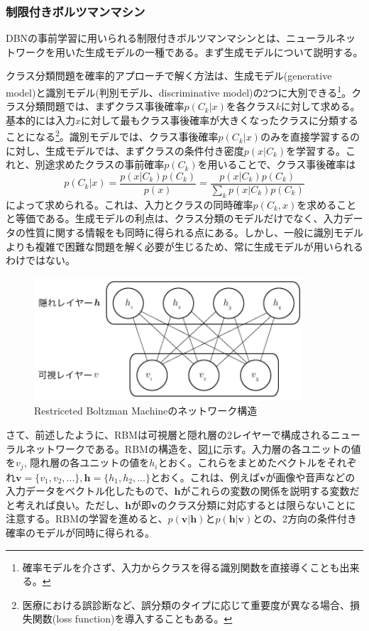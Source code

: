 \subsubsection{制限付きボルツマンマシン}
DBNの事前学習に用いられる制限付きボルツマンマシン\cite{smolensky1986information}とは、ニューラルネットワークを用いた生成モデルの一種である。まず生成モデルについて説明する。\par
クラス分類問題を確率的アプローチで解く方法は、生成モデル(generative model)と識別モデル(判別モデル、discriminative model)の2つに大別できる\cite{bishop2006pattern}\footnote{確率モデルを介さず、入力からクラスを得る識別関数を直接導くことも出来る。}。クラス分類問題では、まずクラス事後確率$p(C_k|x)$を各クラス$k$に対して求める。基本的には入力$x$に対して最もクラス事後確率が大きくなったクラスに分類することになる\footnote{医療における誤診断など、誤分類のタイプに応じて重要度が異なる場合、損失関数(loss function)を導入することもある。}。識別モデルでは、クラス事後確率$p(C_k|x)$のみを直接学習するのに対し、生成モデルでは、まずクラスの条件付き密度$p(x|C_k)$を学習する。これと、別途求めたクラスの事前確率$p(C_k)$を用いることで、クラス事後確率は
\begin{equation}
p(C_k|x) = \frac{p(x | C_k)p(C_k)}{p(x)} = \frac{p(x | C_k)p(C_k)}{\sum_{k}p(x | C_k)p(C_k)}
\end{equation}
によって求められる。これは、入力とクラスの同時確率$p(C_k, x)$を求めることと等価である。生成モデルの利点は、クラス分類のモデルだけでなく、入力データの性質に関する情報をも同時に得られる点にある。しかし、一般に識別モデルよりも複雑で困難な問題を解く必要が生じるため、常に生成モデルが用いられるわけではない。\par
\begin{figure}[tbp]
 \centering
  \includegraphics[width=100mm]{img/c3/rbm}
 \caption{Restriceted Boltzman Machineのネットワーク構造}
 \label{c3_rbm}
\end{figure}
さて、前述したように、RBMは可視層と隠れ層の2レイヤーで構成されるニューラルネットワークである。RBMの構造を、図\ref{c3_rbm}に示す。入力層の各ユニットの値を$v_j$, 隠れ層の各ユニットの値を$h_i$とおく。これらをまとめたベクトルをそれぞれ$\bm{v}=\{v_1, v_2, ...\}, \bm{h}=\{h_1, h_2, ...\}$とおく。これは、例えば$\bm{v}$が画像や音声などの入力データをベクトル化したもので、$\bm{h}$がこれらの変数の関係を説明する変数だと考えれば良い。ただし、$\bm{h}$が即$\bm{v}$のクラス分類に対応するとは限らないことに注意する。RBMの学習を進めると、$p(\bm{v}|\bm{h})$と$p(\bm{h}|\bm{v})$との、2方向の条件付き確率のモデルが同時に得られる。\par
